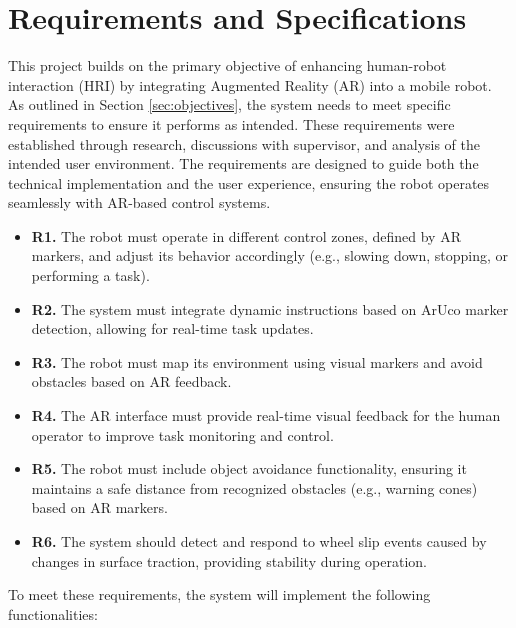 \chapter{\label{ch:req_and_specs} Requirements and Specifications}

This project builds on the primary objective of enhancing human-robot interaction (HRI) by integrating Augmented Reality (AR) into a mobile robot. As outlined in Section \ref{sec:objectives}, the system needs to meet specific requirements to ensure it performs as intended. These requirements were established through research, discussions with supervisor, and analysis of the intended user environment. The requirements are designed to guide both the technical implementation and the user experience, ensuring the robot operates seamlessly with AR-based control systems.

\begin{itemize}
    \item \textbf{R1.} The robot must operate in different control zones, defined by AR markers, and adjust its behavior accordingly (e.g., slowing down, stopping, or performing a task).
    \item \textbf{R2.} The system must integrate dynamic instructions based on ArUco marker detection, allowing for real-time task updates.
    \item \textbf{R3.} The robot must map its environment using visual markers and avoid obstacles based on AR feedback.
    \item \textbf{R4.} The AR interface must provide real-time visual feedback for the human operator to improve task monitoring and control.
    \item \textbf{R5.} The robot must include object avoidance functionality, ensuring it maintains a safe distance from recognized obstacles (e.g., warning cones) based on AR markers.
    \item \textbf{R6.} The system should detect and respond to wheel slip events caused by changes in surface traction, providing stability during operation.
\end{itemize}

To meet these requirements, the system will implement the following functionalities:

